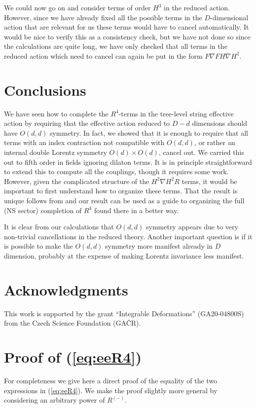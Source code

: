 \documentclass[a4paper,11pt]{article}
\begin{document}
We could now go on and consider terms of order $H^3$ in the reduced action. However, since we have already fixed all the possible terms in the $D$-dimensional action that are relevant for us these terms would have to cancel automatically. It would be nice to verify this as a consistency check, but we have not done so since the calculations are quite long, we have only checked that all terms in the reduced action which need to cancel can again be put in the form $F\nabla FH\nabla H^2$.


\section{Conclusions}
We have seen how to complete the $R^4$-terms in the tree-level string effective action by requiring that the effective action reduced to $D-d$ dimensions should have $O(d,d)$ symmetry.{ In fact, we showed that it is enough to require that all terms with an index contraction not compatible with $O(d,d)$, or rather an internal double Lorentz symmetry $O(d)\times O(d)$, cancel out.} We carried this out to fifth order in fields ignoring dilaton terms. It is in principle straightforward to extend this to compute all the couplings, though it requires some work. However, given the complicated structure of the $H^2\nabla H^2R$ terms, it would be important to first understand how to organize these terms. That the result is unique follows from \cite{Garousi:2020gio} and our result can be used as a guide to organizing the full (NS sector) completion of $R^4$ found there in a better way.

It is clear from our calculations that $O(d,d)$ symmetry appears due to very non-trivial cancellations in the reduced theory. Another important question is if it is possible to make the $O(d,d)$ symmetry more manifest already in $D$ dimension, probably at the expense of making Lorentz invariance less manifest. 




\section*{Acknowledgments}
This work is supported by the grant ``Integrable Deformations'' (GA20-04800S) from the Czech Science Foundation (GA\v CR).


\newpage

\appendix
\section{Proof of (\ref{eq:eeR4})}\label{app:eeR4}
For completeness we give here a direct proof of the equality of the two expressions in (\ref{eq:eeR4}). We make the proof slightly more general by considering an arbitrary power of $R^{(-)}$.
\end{document}
